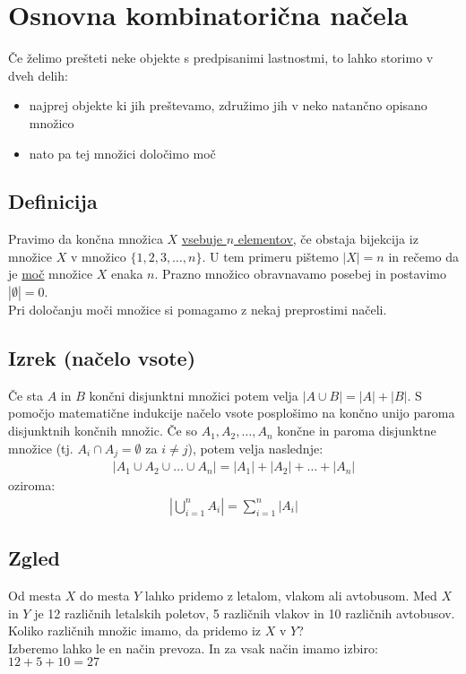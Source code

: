 \section{Osnovna kombinatorična načela}
Če želimo prešteti neke objekte s predpisanimi lastnostmi, to lahko storimo v dveh delih:
\begin{itemize}
    \item najprej objekte ki jih preštevamo, združimo jih v neko natančno opisano množico
    \item nato pa tej množici določimo moč
\end{itemize}

\subsection{Definicija}
Pravimo da končna množica $X$ \underline{vsebuje $n$ elementov}, če obstaja bijekcija iz množice $X$ v množico $\{1, 2, 3, \dots, n\}$. U tem primeru pištemo $|X|=n$ in rečemo da je \underline{moč} množice $X$ enaka $n$. Prazno množico obravnavamo posebej in postavimo $|\emptyset|= 0$. \\[1em]
Pri določanju moči množice si pomagamo z nekaj preprostimi načeli.

\subsection{Izrek (načelo vsote)}
Če sta $A$ in $B$ končni disjunktni množici potem velja $|A \cup B| = |A| + |B|$.
S pomočjo matematične indukcije načelo vsote posplošimo na končno unijo paroma disjunktnih končnih množic.
Če so $A_1, A_2, \dots, A_n$ končne in paroma disjunktne množice (tj. $A_i \cap A_j = \emptyset$ za $i \ne j$), potem velja naslednje:
\begin{align*}
    |A_1 \cup A_2 \cup \dots \cup A_n| = |A_1| + |A_2| + \dots + |A_n|    
\end{align*}
oziroma:
\begin{align*}
    \left| \bigcup_{i = 1}^n A_i \right| = \sum_{i = 1}^n |A_i|
\end{align*}


\subsection{Zgled}
Od mesta $X$ do mesta $Y$ lahko pridemo z letalom, vlakom ali avtobusom. Med $X$ in $Y$ je 12 različnih letalskih poletov, 5 različnih vlakov in 10 različnih avtobusov. Koliko različnih množic imamo, da pridemo iz $X$ v $Y$? \\[1em]
Izberemo lahko le en način prevoza. 
In za vsak način imamo izbiro: $12 + 5 + 10 = 27$


